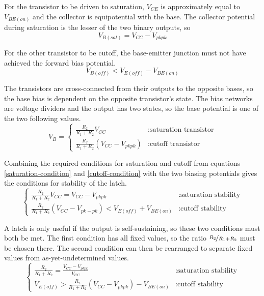 \documentclass[titlepage, letterpaper, 10.5pt]{article}
\begin{document}
For the transistor to be driven to saturation, $V_{CE}$ is approximately equal to $V_{BE(on)}$
and the collector is equipotential with the base. The collector potential
during saturation is the lesser of the two binary outputs, so
\begin{equation}
V_{B(sat)}=V_{CC}-V_{pkpk}
\label{saturation-condition}
\end{equation}

For the other transistor to be cutoff,
the base-emitter junction must not have achieved the forward bias potential.
\begin{equation}
V_{B(off)}<V_{E(off)}-V_{BE(on)}
\label{cutoff-condition}
\end{equation}

The transistors are cross-connected from their outputs to the opposite bases, so the base bias
is dependent on the opposite transistor's state. The bias networks are voltage dividers and the output
has two states, so the base potential is one of the two following values.
\begin{equation}
V_{B}=
\left\{
	\begin{array}{lr}
	\frac{R_{2}}{R_{1}+R_{2}}V_{CC}	& : \textrm{saturation transistor}	\\
	\frac{R_{2}}{R_{1}+R_{2}}(V_{CC}-V_{pkpk})	& : \textrm{cutoff transistor}
	\end{array}
\right.
\label{base-voltages}
\end{equation}

Combining the required conditions for saturation and cutoff from equations
\ref{saturation-condition} and \ref{cutoff-condition}
with the two biasing potentials gives the conditions for stability of the latch.
\begin{equation*}
\left\{
	\begin{array}{lr}
	\frac{R_{2}}{R_{1}+R_{2}}V_{CC}=V_{CC}-V_{pkpk}	& : \textrm{saturation stability}	\\
	\frac{R_{2}}{R_{1}+R_{2}}(V_{CC}-V_{pk-pk})<V_{E(off)}+V_{BE(on)}	& : \textrm{cutoff stability}
	\end{array}
\right.
\end{equation*}

A latch is only useful if the output is self-sustaining, so these two conditions must both be met.
The first condition has all fixed values, so the ratio $\nicefrac{R_{2}}{R_{1}+R_{2}}$ must be chosen there.
The second condition can then be rearranged to separate fixed values from as-yet-undetermined values.
\begin{equation}
\left\{
	\begin{array}{lr}
	\frac{R_{2}}{R_{1}+R_{2}}=\frac{V_{CC}-V_{pkpk}}{V_{CC}}	& : \textrm{saturation stability}	\\
	V_{E(off)}>\frac{R_{2}}{R_{1}+R_{2}}(V_{CC}-V_{pkpk})-V_{BE(on)}	& : \textrm{cutoff stability}
	\end{array}
\right.
\label{stability-conditions}
\end{equation}
\end{document}

